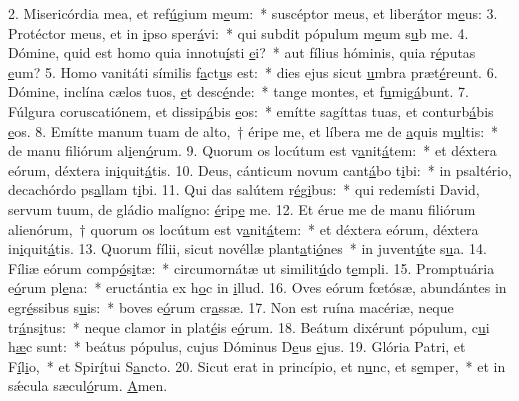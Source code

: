 2. Misericórdia mea, et ref\uline{ú}gium m\uline{e}um:~* suscéptor meus, et liber\uline{á}tor m\uline{e}us:
3. Protéctor meus, et in \uline{i}pso sper\uline{á}vi:~* qui subdit pópulum m\uline{e}um s\uline{u}b me.
4. Dómine, quid est homo quia innotu\uline{í}sti \uline{e}i?~* aut fílius hóminis, quia r\uline{é}putas \uline{e}um?
5. Homo vanitáti símilis f\uline{a}ct\uline{u}s est:~* dies ejus sicut \uline{u}mbra præt\uline{é}reunt.
6. Dómine, inclína cælos tuos, \uline{e}t desc\uline{é}nde:~* tange montes, et f\uline{u}mig\uline{á}bunt.
7. Fúlgura coruscatiónem, et dissip\uline{á}bis \uline{e}os:~* emítte sagíttas tuas, et conturb\uline{á}bis \uline{e}os.
8. Emítte manum tuam de alto,~† éripe me, et líbera me de \uline{a}quis m\uline{u}ltis:~* de manu filiórum al\uline{i}en\uline{ó}rum.
9. Quorum os locútum est v\uline{a}nit\uline{á}tem:~* et déxtera eórum, déxtera in\uline{i}quit\uline{á}tis.
10. Deus, cánticum novum cant\uline{á}bo t\uline{i}bi:~* in psaltério, decachórdo ps\uline{a}llam t\uline{i}bi.
11. Qui das salútem r\uline{é}g\uline{i}bus:~* qui redemísti David, servum tuum, de gládio malígno: \uline{é}rip\uline{e} me.
12. Et érue me de manu filiórum alienórum,~† quorum os locútum est v\uline{a}nit\uline{á}tem:~* et déxtera eórum, déxtera in\uline{i}quit\uline{á}tis.
13. Quorum fílii, sicut novéllæ plant\uline{a}ti\uline{ó}nes~* in juvent\uline{ú}te s\uline{u}a.
14. Fíliæ eórum comp\uline{ó}s\uline{i}tæ:~* circumornátæ ut similit\uline{ú}do t\uline{e}mpli.
15. Promptuária e\uline{ó}rum pl\uline{e}na:~* eructántia ex h\uline{o}c in \uline{i}llud.
16. Oves eórum fœtósæ, abundántes in egr\uline{é}ssibus s\uline{u}is:~* boves e\uline{ó}rum cr\uline{a}ssæ.
17. Non est ruína macériæ, neque tr\uline{á}ns\uline{i}tus:~* neque clamor in plat\uline{é}is e\uline{ó}rum.
18. Beátum dixérunt pópulum, c\uline{u}i h\uline{æ}c sunt:~* beátus pópulus, cujus Dóminus D\uline{e}us \uline{e}jus.
19. Glória Patri, et F\uline{í}l\uline{i}o,~* et Spir\uline{í}tui S\uline{a}ncto.
20. Sicut erat in princípio, et n\uline{u}nc, et s\uline{e}mper,~* et in sǽcula sæcul\uline{ó}rum. \uline{A}men.

